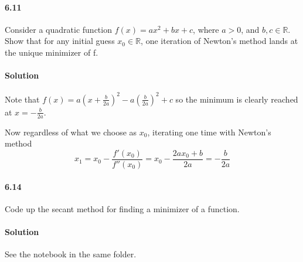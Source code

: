 \documentclass[letterpaper,12pt]{article}
\theoremstyle{definition}
\begin{document}
\paragraph{6.11} Consider a quadratic function $f(x) = ax^2 +bx +c$, where $a > 0$, and $b, c \in\mathbb{R}$. Show that for any initial guess $x_0 \in \mathbb{R}$, one iteration of Newton's method lands at the unique minimizer of f.

\paragraph{Solution} Note that $f(x) =  a(x + \frac{b}{2a})^2 - a(\frac{b}{2a})^2 + c$ so the minimum is clearly reached at  $x = - \frac{b}{2a}$.

Now regardless of what we choose as $x_0$, iterating one time with Newton's method $$ x_1 = x_0 - \frac{f'(x_0)}{f''(x_0)} 
= x_0 - \frac{2ax_0 + b}{2a} 
= - \frac{b}{2a}$$

\paragraph{6.14} Code up the secant method for finding a minimizer of a function. 

\paragraph{Solution} See the notebook in the same folder.


\vspace{25mm}


\end{document}
